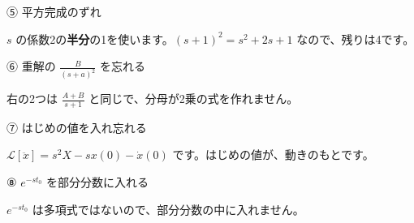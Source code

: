 \begingroup{}%
\noindent\begin{minipage}[t]{0.485\linewidth}\vspace{0pt}
\begin{tsumazuki}{⑤ 平方完成のずれ}
\raggedright{}
$s$ の係数2の\textbf{半分}の1を使います。$(s+1)^2=s^2+2s+1$ なので、残りは4です。
\end{tsumazuki}
\end{minipage}\hfill
\begin{minipage}[t]{0.485\linewidth}\vspace{0pt}
\begin{tsumazuki}{⑥ 重解の $\frac{B}{(s+a)^2}$ を忘れる}
\raggedright{}
右の2つは $\frac{A+B}{s+1}$ と同じで、分母が2乗の式を作れません。
\end{tsumazuki}
\end{minipage}\par
\endgroup

\begingroup{}%
\noindent\begin{minipage}[t]{0.485\linewidth}\vspace{0pt}
\begin{tsumazuki}{⑦ はじめの値を入れ忘れる}
\raggedright{}
$\mathcal L[\ddot x]=s^2X-sx(0)-\dot x(0)$ です。はじめの値が、動きのもとです。
\end{tsumazuki}
\end{minipage}\hfill
\begin{minipage}[t]{0.485\linewidth}\vspace{0pt}
\begin{tsumazuki}{⑧ $e^{-st_0}$ を部分分数に入れる}
\raggedright{}
$e^{-st_0}$ は多項式ではないので、部分分数の中に入れません。
\end{tsumazuki}
\end{minipage}\par
\endgroup


